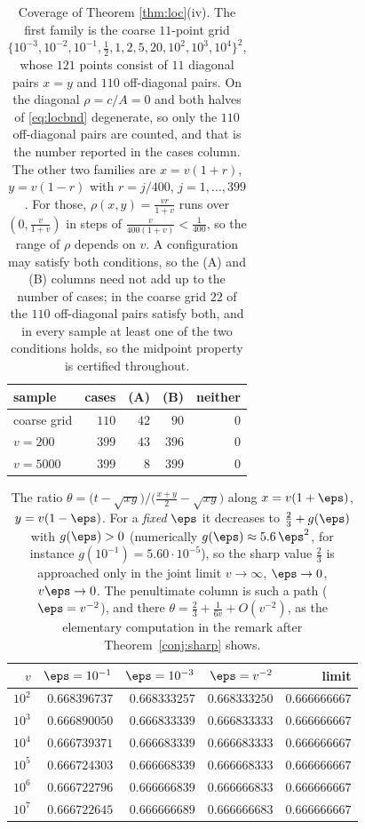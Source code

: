 \begin{table}[htbp]\centering\small
\caption{Coverage of Theorem \ref{thm:loc}(iv). The first family is the coarse
$11$-point grid $\{10^{-3},10^{-2},10^{-1},\frac12,1,2,5,20,10^{2},10^{3},10^{4}\}^{2}$,
whose $121$ points consist of $11$ diagonal pairs $x=y$ and $110$ off-diagonal pairs. On the
diagonal $\rho=c/A=0$ and both halves of \eqref{eq:locbnd} degenerate, so only the $110$
off-diagonal pairs are counted, and that is the number reported in the cases column. The
other two families are $x=v(1+r)$, $y=v(1-r)$ with $r=j/400$, $j=1,\dots,399$. For those,
$\rho(x,y)=\frac{vr}{1+v}$ runs over $(0,\frac{v}{1+v})$ in steps of
$\frac{v}{400(1+v)}<\frac1{400}$, so the range of $\rho$ depends on $v$. A
configuration may satisfy both conditions, so the (A) and (B) columns need not add up to
the number of cases; in the coarse grid $22$ of the $110$ off-diagonal pairs satisfy both,
and in every sample at least one of the two conditions holds, so the midpoint property is
certified throughout.}
\label{tab:cov}
\begin{tabular}{lrrrr}
\toprule
sample & cases & (A) & (B) & neither\\
\midrule
coarse grid & $110$ & $42$ & $90$ & $0$\\
$v=200$ & $399$ & $43$ & $396$ & $0$\\
$v=5000$ & $399$ & $8$ & $399$ & $0$\\
\bottomrule
\end{tabular}
\end{table}

\begin{table}[htbp]\centering\small
\caption{The ratio $\theta=\big(t-\sqrt{xy}\big)/\big(\frac{x+y}{2}-\sqrt{xy}\big)$ along
$x=v(1+\eps)$, $y=v(1-\eps)$. For a \emph{fixed} $\eps$ it decreases to
$\frac23+g(\eps)$ with $g(\eps)>0$ (numerically $g(\eps)\approx5.6\,\eps^{2}$, for
instance $g(10^{-1})=5.60\cdot10^{-5}$), so the sharp value $\frac23$ is approached only in
the joint limit $v\to\infty$, $\eps\to0$, $v\eps\to0$. The penultimate column is such a
path ($\eps=v^{-2}$), and there $\theta=\frac23+\frac{1}{6v}+O(v^{-2})$, as the
elementary computation in the remark after Theorem~\ref{conj:sharp} shows.}
\label{tab:inf}
\begin{tabular}{rrrrr}
\toprule
$v$ & $\eps=10^{-1}$ & $\eps=10^{-3}$ & $\eps=v^{-2}$ & limit\\
\midrule
$10^{2}$ & $0.668396737$ & $0.668333257$ & $0.668333250$ & $0.666666667$\\
$10^{3}$ & $0.666890050$ & $0.666833339$ & $0.666833333$ & $0.666666667$\\
$10^{4}$ & $0.666739371$ & $0.666683339$ & $0.666683333$ & $0.666666667$\\
$10^{5}$ & $0.666724303$ & $0.666668339$ & $0.666668333$ & $0.666666667$\\
$10^{6}$ & $0.666722796$ & $0.666666839$ & $0.666666833$ & $0.666666667$\\
$10^{7}$ & $0.666722645$ & $0.666666689$ & $0.666666683$ & $0.666666667$\\
\bottomrule
\end{tabular}
\end{table}

